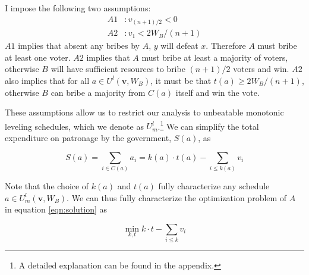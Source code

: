 \documentclass[12pt,a4paper]{article}
\newcommand{\real}{\mathbb{R}_+^n}
\begin{document}
I impose the following two assumptions:
\begin{align*}
    A1 &: v_{(n+1)/2} < 0\\
    A2 &: v_1 < 2W_B/(n+1) 
\end{align*}
$A1$ implies that absent any bribes by $A$, $y$ will defeat $x$. Therefore $A$ must bribe at least one voter. $A2$ implies that $A$ must bribe at least a majority of voters, otherwise $B$ will have sufficient resources to bribe $(n+1)/2$ voters and win. $A2$ also implies that for all $a \in U^l(\mathbf{v}, W_B)$, it must be that $t(a) \geq 2W_B/(n + 1)$, otherwise $B$ can bribe a majority from $C(a)$ itself and win the vote.


These assumptions allow us to restrict our analysis to unbeatable monotonic leveling schedules, which we denote as $U_m^l$.\footnote{A detailed explanation can be found in the appendix.} We can simplify the total expenditure on patronage by the government, $S(a)$, as

\begin{equation*}
    S(a) = \sum_{i \in C(a)}a_i = k(a) \cdot t(a) - \sum_{i \leq k(a)}v_i
\end{equation*}

Note that the choice of $k(a)$ and $t(a)$ fully characterize any schedule $a \in U_m^l(\mathbf{v}, W_B)$. We can thus fully characterize the optimization problem of $A$ in equation \ref{eqn:solution} as

\begin{equation*}
    \min_{k,t} k \cdot t- \sum_{i \leq k} v_i
\end{equation*}
\end{document}
